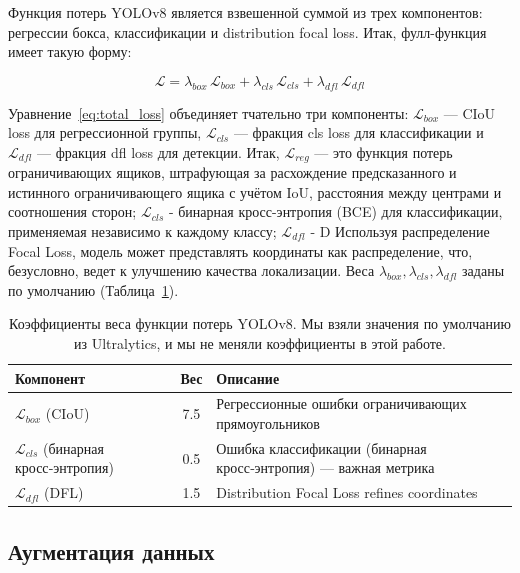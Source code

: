 Функция потерь YOLOv8 является взвешенной суммой из трех компонентов: регрессии бокса, классификации и distribution focal loss. Итак, фулл-функция имеет такую форму:

\begin{equation}
\mathcal{L} = \lambda_{box}\,\mathcal{L}_{box} + \lambda_{cls}\,\mathcal{L}_{cls} + \lambda_{dfl}\,\mathcal{L}_{dfl}
\label{eq:total_loss}
\end{equation}

Уравнение~\eqref{eq:total_loss} объединяет тчательно три компоненты: $\mathcal{L}_{box}$ --- CIoU loss для регрессионной группы, $\mathcal{L}_{cls}$ --- фракция cls loss для классификации и $\mathcal{L}_{dfl}$ --- фракция dfl loss для детекции. Итак, $\mathcal{L}_{reg}$ --- это функция потерь ограничивающих ящиков, штрафующая за расхождение предсказанного и истинного ограничивающего ящика с учётом IoU, расстояния между центрами и соотношения сторон; $\mathcal{L}_{cls}$ - бинарная кросс-энтропия (BCE) для классификации, применяемая независимо к каждому классу; $\mathcal{L}_{dfl}$ - D Используя распределение Focal Loss, модель может представлять координаты как распределение, что, безусловно, ведет к улучшению качества локализации. Веса $\lambda_{box}, \lambda_{cls}, \lambda_{dfl}$ заданы по умолчанию (Таблица~\ref{tab:loss_weights}).

\begin{table}[H]
\centering
\caption{Коэффициенты веса функции потерь YOLOv8. Мы взяли значения по умолчанию из Ultralytics, и мы не меняли коэффициенты в этой работе.}
\label{tab:loss_weights}
\begin{tabular}{lcl}
\toprule
\textbf{Компонент} & \textbf{Вес} & \textbf{Описание} \\
\midrule
$\mathcal{L}_{box}$ (CIoU) & 7.5 & Регрессионные ошибки ограничивающих прямоугольников \\
$\mathcal{L}_{cls}$ (бинарная кросс‑энтропия) & 0.5 & Ошибка классификации (бинарная кросс‑энтропия) — важная метрика \\
$\mathcal{L}_{dfl}$ (DFL) & 1.5 & Distribution Focal Loss refines coordinates \\
\bottomrule
\end{tabular}
\end{table}

\subsection{Аугментация данных}

